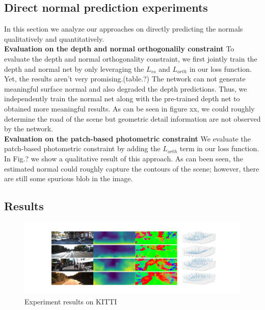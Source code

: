 \documentclass[10pt,twocolumn,letterpaper]{article}
\begin{document}
\subsection{Direct normal prediction experiments}
In this section we analyze our approaches on directly predicting the normals qualitatively and quantitatively. 
\\
\textbf{Evaluation on the depth and normal orthogonalily constraint}
To evaluate the depth and normal orthogonality constraint, we first jointly train the depth and normal net by only leveraging the $L_{vs}$ and $L_{orth}$ in our loss function. Yet, the results aren't very promising.(table.?) The network can not generate meaningful surface normal and also degraded the depth predictions. Thus, we independently train the normal net along with the pre-trained depth net to obtained more meaningful results. As can be seen in figure xx, we could roughly determine the road of the scene but geometric detail information are not observed by the network.
\\
\textbf{Evaluation on the patch-based photometric constraint}
We evaluate the patch-based photometric constraint by adding the $L_{orth}$ term in our loss function. In Fig.? we show a qualitative result of this approach. As can been seen, the estimated normal could roughly capture the contours of the scene; however, there are still some spurious blob in the image. 







\subsection{Results}






\begin{figure}[t!]
  \includegraphics[width=\linewidth]{output.jpg}
  \caption{Experiment results on KITTI}
  \label{fig:KITTI}
\end{figure}
\end{document}
